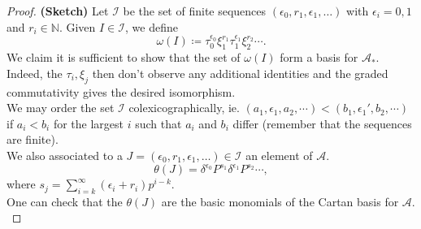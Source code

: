 \documentclass[11pt, a4paper]{article}
\theoremstyle{plain}
\newtheorem*{proof}{Proof}
\begin{document}
\begin{proof}\textbf{(Sketch)}
	Let $\mathcal{I}$ be the set of finite sequences $( \epsilon_0, r_1,\epsilon_1,\ldots) $ with $\epsilon_i = 0,1$ and $r_i \in \mathbb{N}$. 
	Given $I \in \mathcal{I}$, we define
	\[ 
	\omega( I) \coloneqq \tau_0^{\epsilon_0}\xi_1^{r_1}\tau_1^{\epsilon_1}\xi_2^{r_2}\cdots.
	\]
We claim it is sufficient to show that the set of $\omega( I) $ form a basis for $\mathcal{A}_\ast$. Indeed, the $\tau_i, \xi_j$ then don't observe any additional identities and the graded commutativity gives the desired isomorphism.\\
We may order the set $\mathcal{I}$ colexicographically, ie. $( a_1, \epsilon_1,a_2,\cdots) < ( b_1, \epsilon_1', b_2, \cdots) $ if $a_i<b_i$ for the largest $i$ such that $a_i$ and $b_i$ differ (remember that the sequences are finite).\\

We also associated to a $J = ( \epsilon_0, r_1, \epsilon_1,\ldots)  \in \mathcal{I} $ an element of $\mathcal{A}$.
\[ 
\theta( J) = \delta^{\epsilon_0}P^{s_1}\delta^{\epsilon_1}P^{s_2}\cdots,
\]
where $s_j= \sum_{i=k}^{ \infty }( \epsilon_i+ r_i) p^{i-k}$.\\

One can check that the $\theta( J) $ are the basic monomials of the Cartan basis for $\mathcal{A}$.\\


\end{proof}
\end{document}

